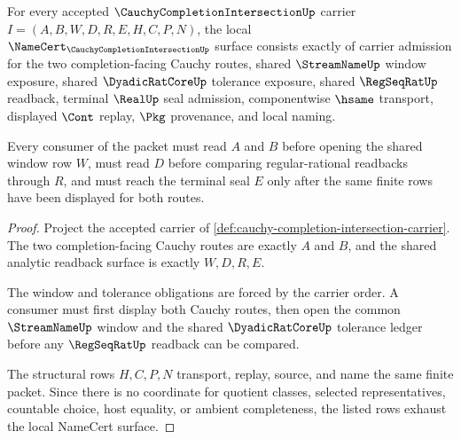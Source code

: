 \begin{theorem}
\label{thm:cauchy-completion-intersection-namecert-obligations}
For every accepted $\CauchyCompletionIntersectionUp$ carrier $I=(A,B,W,D,R,E,H,C,P,N)$, the local $\NameCert_{\CauchyCompletionIntersectionUp}$ surface consists exactly of carrier admission for the two completion-facing Cauchy routes, shared $\StreamNameUp$ window exposure, shared $\DyadicRatCoreUp$ tolerance exposure, shared $\RegSeqRatUp$ readback, terminal $\RealUp$ seal admission, componentwise $\hsame$ transport, displayed $\Cont$ replay, $\Pkg$ provenance, and local naming.

Every consumer of the packet must read $A$ and $B$ before opening the shared window row $W$, must read $D$ before comparing regular-rational readbacks through $R$, and must reach the terminal seal $E$ only after the same finite rows have been displayed for both routes.
\end{theorem}
\begin{proof}
Project the accepted carrier of \autoref{def:cauchy-completion-intersection-carrier}. The two completion-facing Cauchy routes are exactly $A$ and $B$, and the shared analytic readback surface is exactly $W,D,R,E$.

The window and tolerance obligations are forced by the carrier order. A consumer must first display both Cauchy routes, then open the common $\StreamNameUp$ window and the shared $\DyadicRatCoreUp$ tolerance ledger before any $\RegSeqRatUp$ readback can be compared.

The structural rows $H,C,P,N$ transport, replay, source, and name the same finite packet. Since there is no coordinate for quotient classes, selected representatives, countable choice, host equality, or ambient completeness, the listed rows exhaust the local NameCert surface.
\end{proof}

